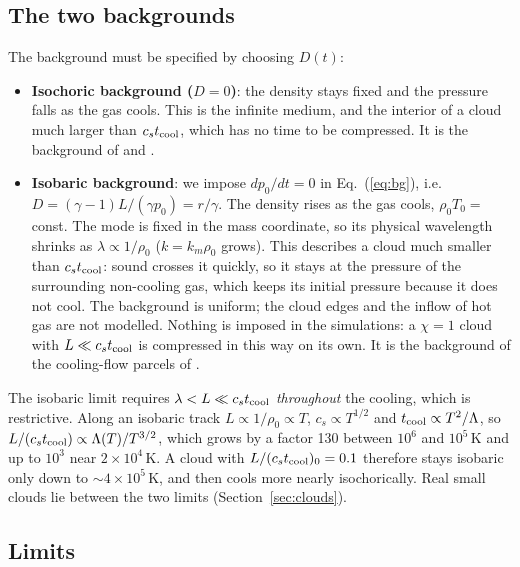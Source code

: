 \documentclass[11pt]{article}
\newcommand{\tcool}{t_{\rm cool}}
\newcommand{\cstc}{c_s t_{\rm cool}}
\begin{document}
\subsection{The two backgrounds}
\label{sec:backgrounds}
The background must be specified by choosing $D(t)$:
\begin{itemize}
\item \textbf{Isochoric background ($D=0$)}: the density stays fixed and the
  pressure falls as the gas cools. This is the infinite medium, and the interior of
  a cloud much larger than $\cstc$, which has no time to be compressed. It is the
  background of \citet{schwarz72} and \citet{burkert00}.
\item \textbf{Isobaric background}: we impose $dp_0/dt=0$ in Eq.~(\ref{eq:bg}),
  i.e.\ $D=(\gamma-1)L/(\gamma p_0)=r/\gamma$. The density rises as the gas cools,
  $\rho_0T_0=$ const. The mode is fixed in the mass coordinate, so its physical
  wavelength shrinks as $\lambda\propto1/\rho_0$ ($k=k_m\rho_0$ grows). This
  describes a cloud much smaller than $\cstc$: sound crosses it quickly, so it stays
  at the pressure of the surrounding non-cooling gas, which keeps its initial
  pressure because it does not cool. The background is uniform; the cloud edges
  and the inflow of hot gas are not modelled. Nothing is imposed in the
  simulations: a $\chi=1$ cloud with $L\ll\cstc$ is compressed in this way on its
  own. It is the background of the cooling-flow parcels of \citet{mathews78}.
\end{itemize}
The isobaric limit requires $\lambda<L\ll\cstc$ \emph{throughout} the cooling,
which is restrictive. Along an isobaric track $L\propto1/\rho_0\propto T$,
$c_s\propto T^{1/2}$ and $\tcool\propto T^2/\Lambda$, so
$L/(\cstc)\propto\Lambda(T)/T^{3/2}$, which grows by a factor 130 between
$10^6$ and $10^5$\,K and up to $10^3$ near $2\times10^4$\,K. A cloud with
$L/(\cstc)_0=0.1$ therefore stays isobaric only down to $\sim4\times10^5$\,K, and
then cools more nearly isochorically. Real small clouds lie between the two
limits (Section~\ref{sec:clouds}).

\subsection{Limits}
\end{document}
